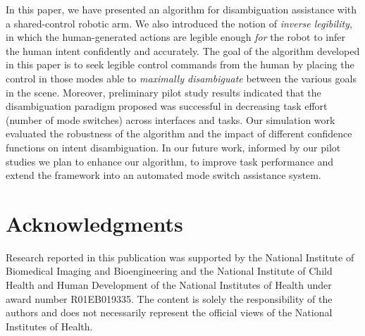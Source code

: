 \documentclass[conference]{IEEEtran}
\begin{document}
In this paper, we have presented an algorithm for disambiguation assistance with a shared-control robotic arm. We also introduced the notion of \textit{inverse legibility}, in which the human-generated actions are legible enough \textit{for} the robot to infer the human intent confidently and accurately. The goal of the algorithm developed in this paper is to seek legible control commands from the human by placing the control in those modes able to \textit{maximally disambiguate} between the various goals in the scene.  Moreover, preliminary pilot study results indicated that the disambiguation paradigm proposed was successful in decreasing task effort (number of mode switches) across interfaces and tasks. Our simulation work evaluated the robustness of the algorithm and the impact of different confidence functions on intent disambiguation. In our future work, informed by our pilot studies we plan to enhance our algorithm, to improve task performance and extend the framework into an automated mode switch assistance system. 

\section*{Acknowledgments}
Research reported in this publication was supported by the
National Institute of Biomedical Imaging and Bioengineering  and the National Institute of Child Health and Human Development of the National Institutes of Health
under award number R01EB019335.  The content is solely
the responsibility of the authors and does not necessarily
represent the official views of the National Institutes of Health.
%
\end{document}
